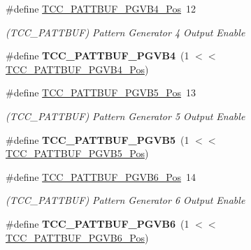 \begin{DoxyCompactItemize}
\item 
\hypertarget{group___s_a_m_l21___t_c_c_gad227eda321b09e3fa04f374b7c212670}{}\#define \hyperlink{group___s_a_m_l21___t_c_c_gad227eda321b09e3fa04f374b7c212670}{T\+C\+C\+\_\+\+P\+A\+T\+T\+B\+U\+F\+\_\+\+P\+G\+V\+B4\+\_\+\+Pos}~12\label{group___s_a_m_l21___t_c_c_gad227eda321b09e3fa04f374b7c212670}

\begin{DoxyCompactList}\small\item\em (T\+C\+C\+\_\+\+P\+A\+T\+T\+B\+U\+F) Pattern Generator 4 Output Enable \end{DoxyCompactList}\item 
\hypertarget{group___s_a_m_l21___t_c_c_gaea993ada6344510f8c3010f8b12cdc7c}{}\#define {\bfseries T\+C\+C\+\_\+\+P\+A\+T\+T\+B\+U\+F\+\_\+\+P\+G\+V\+B4}~(1 $<$$<$ \hyperlink{group___s_a_m_l21___t_c_c_gad227eda321b09e3fa04f374b7c212670}{T\+C\+C\+\_\+\+P\+A\+T\+T\+B\+U\+F\+\_\+\+P\+G\+V\+B4\+\_\+\+Pos})\label{group___s_a_m_l21___t_c_c_gaea993ada6344510f8c3010f8b12cdc7c}

\item 
\hypertarget{group___s_a_m_l21___t_c_c_gafc9b6f6f126b18736ac10190c58d3e24}{}\#define \hyperlink{group___s_a_m_l21___t_c_c_gafc9b6f6f126b18736ac10190c58d3e24}{T\+C\+C\+\_\+\+P\+A\+T\+T\+B\+U\+F\+\_\+\+P\+G\+V\+B5\+\_\+\+Pos}~13\label{group___s_a_m_l21___t_c_c_gafc9b6f6f126b18736ac10190c58d3e24}

\begin{DoxyCompactList}\small\item\em (T\+C\+C\+\_\+\+P\+A\+T\+T\+B\+U\+F) Pattern Generator 5 Output Enable \end{DoxyCompactList}\item 
\hypertarget{group___s_a_m_l21___t_c_c_ga8abd6b00005f1f3691646ea44547606b}{}\#define {\bfseries T\+C\+C\+\_\+\+P\+A\+T\+T\+B\+U\+F\+\_\+\+P\+G\+V\+B5}~(1 $<$$<$ \hyperlink{group___s_a_m_l21___t_c_c_gafc9b6f6f126b18736ac10190c58d3e24}{T\+C\+C\+\_\+\+P\+A\+T\+T\+B\+U\+F\+\_\+\+P\+G\+V\+B5\+\_\+\+Pos})\label{group___s_a_m_l21___t_c_c_ga8abd6b00005f1f3691646ea44547606b}

\item 
\hypertarget{group___s_a_m_l21___t_c_c_ga8033c8e079c163243d32c1099ce632fe}{}\#define \hyperlink{group___s_a_m_l21___t_c_c_ga8033c8e079c163243d32c1099ce632fe}{T\+C\+C\+\_\+\+P\+A\+T\+T\+B\+U\+F\+\_\+\+P\+G\+V\+B6\+\_\+\+Pos}~14\label{group___s_a_m_l21___t_c_c_ga8033c8e079c163243d32c1099ce632fe}

\begin{DoxyCompactList}\small\item\em (T\+C\+C\+\_\+\+P\+A\+T\+T\+B\+U\+F) Pattern Generator 6 Output Enable \end{DoxyCompactList}\item 
\hypertarget{group___s_a_m_l21___t_c_c_ga27e5b0de90406b1d54ae33f9c2e528bd}{}\#define {\bfseries T\+C\+C\+\_\+\+P\+A\+T\+T\+B\+U\+F\+\_\+\+P\+G\+V\+B6}~(1 $<$$<$ \hyperlink{group___s_a_m_l21___t_c_c_ga8033c8e079c163243d32c1099ce632fe}{T\+C\+C\+\_\+\+P\+A\+T\+T\+B\+U\+F\+\_\+\+P\+G\+V\+B6\+\_\+\+Pos})\label{group___s_a_m_l21___t_c_c_ga27e5b0de90406b1d54ae33f9c2e528bd}


\end{DoxyCompactItemize}
